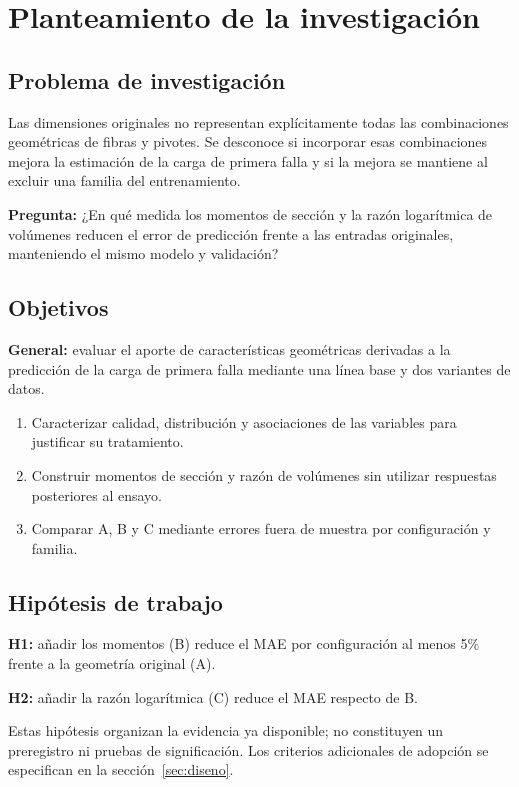 \section{Planteamiento de la investigación}
\label{sec:planteamiento}

\subsection{Problema de investigación}
Las dimensiones originales no representan explícitamente todas las combinaciones geométricas de fibras y pivotes. Se desconoce si incorporar esas combinaciones mejora la estimación de la carga de primera falla y si la mejora se mantiene al excluir una familia del entrenamiento.

\noindent\textbf{Pregunta:} ¿En qué medida los momentos de sección y la razón logarítmica de volúmenes reducen el error de predicción frente a las entradas originales, manteniendo el mismo modelo y validación?

\subsection{Objetivos}
\noindent\textbf{General:} evaluar el aporte de características geométricas derivadas a la predicción de la carga de primera falla mediante una línea base y dos variantes de datos.
\begin{enumerate}
\item Caracterizar calidad, distribución y asociaciones de las variables para justificar su tratamiento.
\item Construir momentos de sección y razón de volúmenes sin utilizar respuestas posteriores al ensayo.
\item Comparar A, B y C mediante errores fuera de muestra por configuración y familia.
\end{enumerate}

\subsection{Hipótesis de trabajo}
\noindent\textbf{H1:} añadir los momentos (B) reduce el MAE por configuración al menos 5\% frente a la geometría original (A).

\noindent\textbf{H2:} añadir la razón logarítmica (C) reduce el MAE respecto de B.

Estas hipótesis organizan la evidencia ya disponible; no constituyen un preregistro ni pruebas de significación. Los criterios adicionales de adopción se especifican en la sección~\ref{sec:diseno}.

